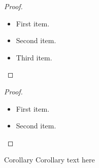 \documentclass{beamer}
\begin{document}
    \begin{frame}

        \begin{proof}
            \begin{itemize}
                \item First item.
                \item Second item.
                \item Third item.
            \end{itemize}
        \end{proof}     
        \vfill \pause 

        \begin{proof}
            \begin{itemize}
                \item First item.
                \pause
                \item Second item.
                \pause
            \end{itemize}
        \end{proof}

        \vfill \pause

        \begin{block}{Corollary}
            Corollary text here
        \end{block}        

    \end{frame}
\end{document}
